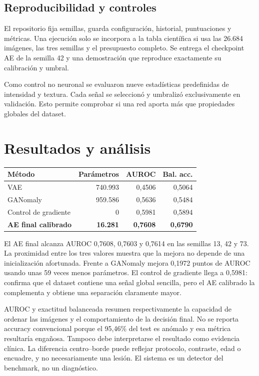 \documentclass[10pt,a4paper,twocolumn]{article}
\begin{document}
\subsection{Reproducibilidad y controles}

El repositorio fija semillas, guarda configuración, historial, puntuaciones y
métricas. Una ejecución solo se incorpora a la tabla científica si usa las
26.684 imágenes, las tres semillas y el presupuesto completo. Se entrega el
checkpoint AE de la semilla 42 y una demostración que reproduce exactamente su
calibración y umbral.

Como control no neuronal se evaluaron nueve estadísticas predefinidas de
intensidad y textura. Cada señal se seleccionó y umbralizó exclusivamente en
validación. Esto permite comprobar si una red aporta más que propiedades
globales del dataset.

\section{Resultados y análisis}

\begin{center}
\small
\begin{tabular}{lrrr}
\toprule
Método & Parámetros & AUROC & Bal. acc. \\
\midrule
VAE & 740.993 & 0,4506 & 0,5064 \\
GANomaly & 959.586 & 0,5636 & 0,5484 \\
Control de gradiente & 0 & 0,5981 & 0,5894 \\
\textbf{AE final calibrado} & \textbf{16.281} &
\textbf{0,7608} & \textbf{0,6790} \\
\bottomrule
\end{tabular}
\end{center}

El AE final alcanza AUROC 0,7608, 0,7603 y 0,7614 en las semillas 13, 42 y
73. La proximidad entre los tres valores muestra que la mejora no depende de
una inicialización afortunada. Frente a GANomaly mejora 0,1972 puntos de AUROC usando unas 59
veces menos parámetros. El control de gradiente llega a 0,5981: confirma que el
dataset contiene una señal global sencilla, pero el AE calibrado la complementa
y obtiene una separación claramente mayor.

AUROC y exactitud balanceada resumen respectivamente la capacidad de ordenar
las imágenes y el comportamiento de la decisión final. No se reporta accuracy
convencional porque el 95,46\% del test es anómalo y esa métrica resultaría
engañosa. Tampoco debe interpretarse el resultado como evidencia clínica. La diferencia centro--borde
puede reflejar protocolo, contraste, edad o encuadre, y no necesariamente una
lesión. El sistema es un detector del benchmark, no un diagnóstico.
\end{document}
